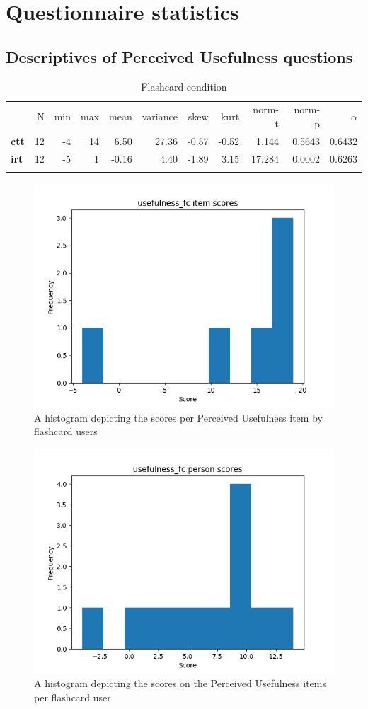 \chapter{Questionnaire statistics}
\label{app:questionnaire}

\FloatBarrier
\section{Descriptives of Perceived Usefulness questions}

\begin{longtable}[c]{@{}lrrrrrrrrrr@{}}
\caption{Flashcard condition}
\endfirsthead
\endhead
\toprule\addlinespace
& N & min & max & mean & variance & skew & kurt & norm-t &
norm-p & $\alpha$
\\\addlinespace
\midrule
\textbf{ctt} & 12 & -4 & 14 & 6.50 & 27.36 & -0.57 & -0.52 & 1.144 &
0.5643 & 0.6432
\\\addlinespace
\textbf{irt} & 12 & -5 & 1 & -0.16 & 4.40 & -1.89 & 3.15 & 17.284 &
0.0002 & 0.6263
\\\addlinespace
\bottomrule
    \label{tab:usefulness_fc}
\end{longtable}

\begin{figure}
    \centering
    \includegraphics[width=.7\textwidth]{img/usefulness_fc_diff.png}
    \caption{A histogram depicting the scores per Perceived Usefulness item by flashcard users}
    \label{fig:usefulness_fc_diff}
\end{figure}
\begin{figure}
    \centering
    \includegraphics[width=.7\textwidth]{img/usefulness_fc_abil.png}
    \caption{A histogram depicting the scores on the Perceived Usefulness items per flashcard user}
    \label{fig:usefulness_fc_abil}
\end{figure}

